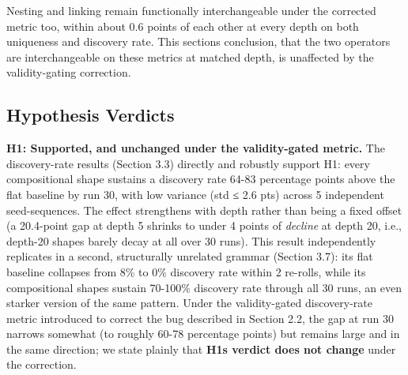 \documentclass[
  10pt,
  twocolumn]{article}
\begin{document}
Nesting and linking remain functionally interchangeable under the
corrected metric too, within about 0.6 points of each other at every
depth on both uniqueness and discovery rate. This
section\textquotesingle s conclusion, that the two operators are
interchangeable on these metrics at matched depth, is unaffected by the
validity-gating correction.

\subsection{Hypothesis Verdicts}\label{hypothesis-verdicts}

\textbf{H1: Supported, and unchanged under the validity-gated metric.}
The discovery-rate results (Section 3.3) directly and robustly support
H1: every compositional shape sustains a discovery rate 64-83 percentage
points above the flat baseline by run 30, with low variance (std ≤ 2.6
pts) across 5 independent seed-sequences. The effect strengthens with
depth rather than being a fixed offset (a 20.4-point gap at depth 5
shrinks to under 4 points of \emph{decline} at depth 20, i.e., depth-20
shapes barely decay at all over 30 runs). This result independently
replicates in a second, structurally unrelated grammar (Section 3.7):
its flat baseline collapses from 8\% to 0\% discovery rate within 2
re-rolls, while its compositional shapes sustain 70-100\% discovery rate
through all 30 runs, an even starker version of the same pattern. Under
the validity-gated discovery-rate metric introduced to correct the bug
described in Section 2.2, the gap at run 30 narrows somewhat (to roughly
60-78 percentage points) but remains large and in the same direction; we
state plainly that \textbf{H1\textquotesingle s verdict does not change}
under the correction.
\end{document}
